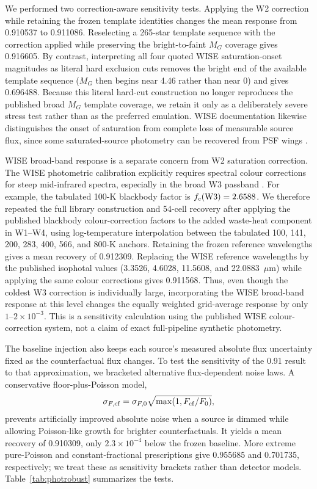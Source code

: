 \documentclass[fleqn,usenatbib]{mnras}
\begin{document}
We performed two correction-aware sensitivity tests. Applying the W2 correction while retaining the frozen template identities changes the mean response from 0.910537 to 0.911086. Reselecting a 265-star template sequence with the correction applied while preserving the bright-to-faint $M_G$ coverage gives 0.916605. By contrast, interpreting all four quoted WISE saturation-onset magnitudes as literal hard exclusion cuts removes the bright end of the available template sequence ($M_G$ then begins near 4.46 rather than near 0) and gives 0.696488. Because this literal hard-cut construction no longer reproduces the published broad $M_G$ template coverage, we retain it only as a deliberately severe stress test rather than as the preferred emulation. WISE documentation likewise distinguishes the onset of saturation from complete loss of measurable source flux, since some saturated-source photometry can be recovered from PSF wings \citep{Cutri2012}.

WISE broad-band response is a separate concern from W2 saturation correction. The WISE photometric calibration explicitly requires spectral colour corrections for steep mid-infrared spectra, especially in the broad W3 passband \citep{Wright2010}. For example, the tabulated 100-K blackbody factor is $f_c({\rm W3})=2.6588$. We therefore repeated the full library construction and 54-cell recovery after applying the published blackbody colour-correction factors to the added waste-heat component in W1--W4, using log-temperature interpolation between the tabulated 100, 141, 200, 283, 400, 566, and 800-K anchors. Retaining the frozen reference wavelengths gives a mean recovery of 0.912309. Replacing the WISE reference wavelengths by the published isophotal values (3.3526, 4.6028, 11.5608, and 22.0883~$\mu$m) while applying the same colour corrections gives 0.911568. Thus, even though the coldest W3 correction is individually large, incorporating the WISE broad-band response at this level changes the equally weighted grid-average response by only $1$--$2\times10^{-3}$. This is a sensitivity calculation using the published WISE colour-correction system, not a claim of exact full-pipeline synthetic photometry.

The baseline injection also keeps each source's measured absolute flux uncertainty fixed as the counterfactual flux changes. To test the sensitivity of the 0.91 result to that approximation, we bracketed alternative flux-dependent noise laws. A conservative floor-plus-Poisson model,
\begin{equation}
\sigma_{F,\rm cf}=\sigma_{F,0}\sqrt{\max(1,F_{\rm cf}/F_0)},
\end{equation}
prevents artificially improved absolute noise when a source is dimmed while allowing Poisson-like growth for brighter counterfactuals. It yields a mean recovery of 0.910309, only $2.3\times10^{-4}$ below the frozen baseline. More extreme pure-Poisson and constant-fractional prescriptions give 0.955685 and 0.701735, respectively; we treat these as sensitivity brackets rather than detector models. Table~\ref{tab:photrobust} summarizes the tests.
\end{document}
